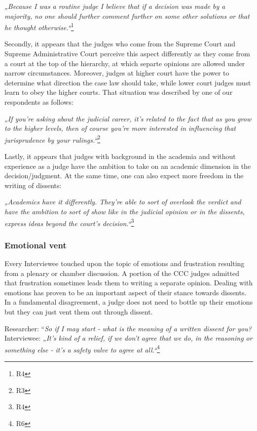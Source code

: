 \documentclass[
  11pt,
]{article}
\begin{document}
\emph{„Because I was a routine judge I believe that if a decision was made by a majority, no one should further comment further on some other solutions or that he thought otherwise.``}\footnote{R4}

Secondly, it appears that the judges who come from the Supreme Court and Supreme Administrative Court perceive this aspect differently as they come from a court at the top of the hierarchy, at which separte opinions are allowed under narrow circumstances. Moreover, judges at higher court have the power to determine what direction the case law should take, while lower court judges must learn to obey the higher courts. That situation was described by one of our respondents as follows:

\emph{„If you're asking about the judicial career, it's related to the fact that as you grow to the higher levels, then of course you're more interested in influencing that jurisprudence by your rulings.``}\footnote{R3}

Lastly, it appears that judges with background in the academia and without experience as a judge have the ambition to take on an academic dimension in the decision/judgment. At the same time, one can also expect more freedom in the writing of dissents:

\emph{„Academics have it differently. They're able to sort of overlook the verdict and have the ambition to sort of show like in the judicial opinion or in the dissents, express ideas beyond the court's decision.``}\footnote{R4}

\subsubsection{Emotional vent}\label{emotional-vent}

Every Interviewee touched upon the topic of emotions and frustration resulting from a plenary or chamber discussion. A portion of the CCC judges admitted that frustration sometimes leads them to writing a separate opinion. Dealing with emotions has proven to be an important aspect of their stance towards dissents. In a fundamental disagreement, a judge does not need to bottle up their emotions but they can just vent them out through dissent.

Researcher: ``\emph{So if I may start - what is the meaning of a written dissent for you?}
Interviewee: \emph{„It's kind of a relief, if we don't agree that we do, in the reasoning or something else - it's a safety valve to agree at all.``}\footnote{R6}
\end{document}
